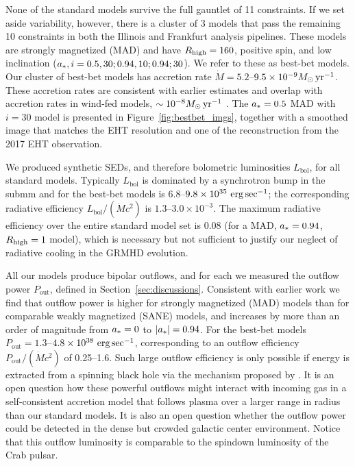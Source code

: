 None of the standard models survive the full gauntlet of 11 constraints.
If we set aside variability, however, there is a cluster of 3 models that pass the remaining 10 constraints in both the Illinois and Frankfurt analysis pipelines.
These models are strongly magnetized (MAD) and have $R_\mathrm{high} = 160$, positive spin, and low inclination ($a_*, i = 0.5, 30; 0.94, 10; 0.94; 30$).
We refer to these as best-bet models.
Our cluster of best-bet models has accretion rate $\dot{M} = 5.2$--$9.5 \times 10^{-9}M_\odot\,\mathrm{yr}^{-1}$.
These accretion rates are consistent with earlier estimates and overlap with accretion rates in wind-fed models, $\sim 10^{-8} M_\odot\,\mathrm{yr}^{-1}$ \citep{2020ApJ...896L...6R}.
The $a_* = 0.5$ MAD with $i=30$ model is presented in Figure~\ref{fig:bestbet_imgs}, together with a smoothed image that matches the EHT resolution and one of the reconstruction from the 2017 EHT observation.

We produced synthetic SEDs, and therefore bolometric luminosities $L_\mathrm{bol}$, for all standard models.  Typically $L_\mathrm{bol}$ is dominated by a synchrotron bump in the submm and for the best-bet models is $6.8$--$9.8\times10^{35}\,\,\mathrm{erg}\,\mathrm{sec}^{-1}$; the corresponding radiative efficiency $L_\mathrm{bol}/(\dot{M} c^2)$ is $1.3$--$3.0\times 10^{-3}$.  The maximum radiative efficiency over the entire standard model set is 0.08 (for a MAD, $a_* = 0.94$, $R_\mathrm{high} = 1$ model), which is necessary but not sufficient to justify our neglect of radiative cooling in the GRMHD evolution.

All our models produce bipolar outflows, and for each we measured the outflow power $P_\mathrm{out}$, defined in Section~\ref{sec:discussions}. Consistent with earlier work we find that outflow power is higher for strongly magnetized (MAD) models than for comparable weakly magnetized (SANE) models, and increases by more than an order of magnitude from $a_* = 0$ to $|a_*| = 0.94$.  For the best-bet models $P_\mathrm{out} = 1.3$--$4.8 \times 10^{38}\,\,\mathrm{erg}\,\mathrm{sec}^{-1}$, corresponding to an outflow efficiency $P_\mathrm{out} /(\dot{M} c^2)$ of 0.25--1.6.  Such large  outflow efficiency is only possible if energy is extracted from a spinning black hole via the mechanism proposed by  \cite{1977MNRAS.179..433B}.  It is an open question how these powerful outflows might interact with incoming gas in a self-consistent accretion model that follows plasma over a larger range in radius than our standard models.  It is also an open question whether the outflow power could be detected in the dense but crowded galactic center environment.  Notice that this outflow luminosity is comparable to the spindown luminosity of the Crab pulsar.

